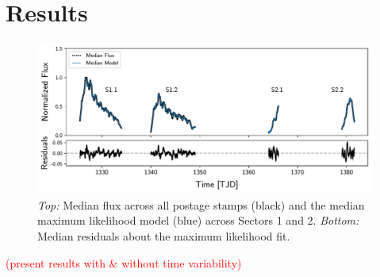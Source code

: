 \documentclass[modern]{aastex62}
\newcommand{\todo}[1]{\textcolor{red}{#1}}
\begin{document}
\section{Results}
\label{sec:results}

\begin{figure}[t!]
    \begin{centering}
    \includegraphics[width=\linewidth]{figures/model.pdf}
    \caption{\label{fig:model}
             \emph{Top:} Median flux across all postage stamps (black) and
             the median maximum likelihood model (blue) across Sectors 1 and 2.
             \emph{Bottom:} Median residuals about the maximum likelihood fit.
             }
    \end{centering}
\end{figure}

\todo{(present results with \& without time variability)}
\end{document}
